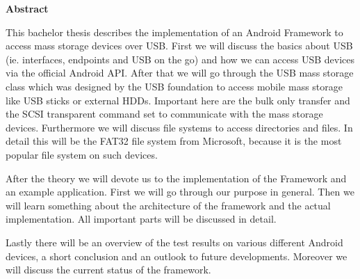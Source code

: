

\clearemptydoublepage
{}
{}	





\vspace*{2cm}
\begin{center}
{\Large \bf Abstract}
\end{center}
\vspace{1cm}

This bachelor thesis describes the implementation of an Android Framework to access mass storage devices over USB. First we will discuss the basics about USB (ie. interfaces, endpoints and USB on the go) and how we can access USB devices via the official Android API. After that we will go through the USB mass storage class which was designed by the USB foundation to access mobile mass storage like USB sticks or external HDDs. Important here are the bulk only transfer and the SCSI transparent command set to communicate with the mass storage devices. Furthermore we will discuss file systems to access directories and files. In detail this will be the FAT32 file system from Microsoft, because it is the most popular file system on such devices.

After the theory we will devote us to the implementation of the Framework and an example application. First we will go through our purpose in general. Then we will learn something about the architecture of the framework and the actual implementation. All important parts will be discussed in detail.

Lastly there will be an overview of the test results on various different Android devices, a short conclusion and an outlook to future developments. Moreover we will discuss the current status of the framework. 